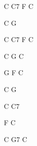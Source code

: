 \documentclass[14pt]{extarticle}%
\begin{document}
\begin{minipage}[t]{0.3\textwidth}
C C7 F C

C G

C C7 F C

C G C
\\

\hspace*{-1cm}%
\begin{minipage}{.8\textwidth}%
G F C

C G

C C7

F C 

C G7 C
\end{minipage}%

\end{minipage}



\end{document}
